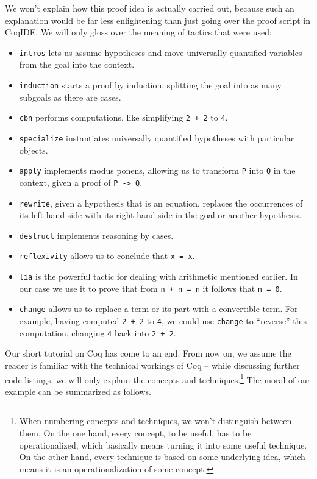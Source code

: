 \documentclass[declaration,mgr,english,shortabstract]{iithesis}
\newcommand{\m}[1]{\texttt{#1}}
\begin{document}
We won't explain how this proof idea is actually carried out, because such an explanation would be far less enlightening than just going over the proof script in CoqIDE. We will only gloss over the meaning of tactics that were used:

\begin{itemize}
    \item \m{intros} lets us assume hypotheses and move universally quantified variables from the goal into the context.
    \item \m{induction} starts a proof by induction, splitting the goal into as many subgoals as there are cases.
    \item \m{cbn} performs computations, like simplifying \m{2 + 2} to \m{4}.
    \item \m{specialize} instantiates universally quantified hypotheses with particular objects.
    \item \m{apply} implements modus ponens, allowing us to transform \m{P} into \m{Q} in the context, given a proof of \m{P -> Q}.
    \item \m{rewrite}, given a hypothesis that is an equation, replaces the occurrences of its left-hand side with its right-hand side in the goal or another hypothesis.
    \item \m{destruct} implements reasoning by cases.
    \item \m{reflexivity} allows us to conclude that \m{x = x}.
    \item \m{lia} is the powerful tactic for dealing with arithmetic mentioned earlier. In our case we use it to prove that from \m{n + n = n} it follows that \m{n = 0}.
    \item \m{change} allows us to replace a term or its part with a convertible term. For example, having computed \m{2 + 2} to \m{4}, we could use \m{change} to ``reverse'' this computation, changing \m{4} back into \m{2 + 2}.
\end{itemize}

Our short tutorial on Coq has come to an end. From now on, we assume the reader is familiar with the technical workings of Coq -- while discussing further code listings, we will only explain the concepts and techniques.\footnote{When numbering concepts and techniques, we won't distinguish between them. On the one hand, every concept, to be useful, has to be operationalized, which basically means turning it into some useful technique. On the other hand, every technique is based on some underlying idea, which means it is an operationalization of some concept.} The moral of our example can be summarized as follows.
\end{document}
